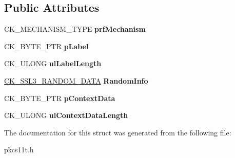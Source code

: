 \subsection*{Public Attributes}
\begin{DoxyCompactItemize}
\item 
\mbox{\label{struct_c_k___t_l_s___k_d_f___p_a_r_a_m_s_a48bcde61505eab05d4f13f104d779f71}} 
C\+K\+\_\+\+M\+E\+C\+H\+A\+N\+I\+S\+M\+\_\+\+T\+Y\+PE {\bfseries prf\+Mechanism}
\item 
\mbox{\label{struct_c_k___t_l_s___k_d_f___p_a_r_a_m_s_ab28115d36034ff6b09924802842098b7}} 
C\+K\+\_\+\+B\+Y\+T\+E\+\_\+\+P\+TR {\bfseries p\+Label}
\item 
\mbox{\label{struct_c_k___t_l_s___k_d_f___p_a_r_a_m_s_a3811ef228dbb1d1a125767b521129fae}} 
C\+K\+\_\+\+U\+L\+O\+NG {\bfseries ul\+Label\+Length}
\item 
\mbox{\label{struct_c_k___t_l_s___k_d_f___p_a_r_a_m_s_afd08f5b71ccd5afd2f2e98c1c8b9a487}} 
\hyperlink{struct_c_k___s_s_l3___r_a_n_d_o_m___d_a_t_a}{C\+K\+\_\+\+S\+S\+L3\+\_\+\+R\+A\+N\+D\+O\+M\+\_\+\+D\+A\+TA} {\bfseries Random\+Info}
\item 
\mbox{\label{struct_c_k___t_l_s___k_d_f___p_a_r_a_m_s_af274160d565d75c39bdd5dd0c4e82e81}} 
C\+K\+\_\+\+B\+Y\+T\+E\+\_\+\+P\+TR {\bfseries p\+Context\+Data}
\item 
\mbox{\label{struct_c_k___t_l_s___k_d_f___p_a_r_a_m_s_a7bccf27647ecf2d8c41e7a63a69885f5}} 
C\+K\+\_\+\+U\+L\+O\+NG {\bfseries ul\+Context\+Data\+Length}
\end{DoxyCompactItemize}


The documentation for this struct was generated from the following file\+:\begin{DoxyCompactItemize}
\item 
pkcs11t.\+h\end{DoxyCompactItemize}
